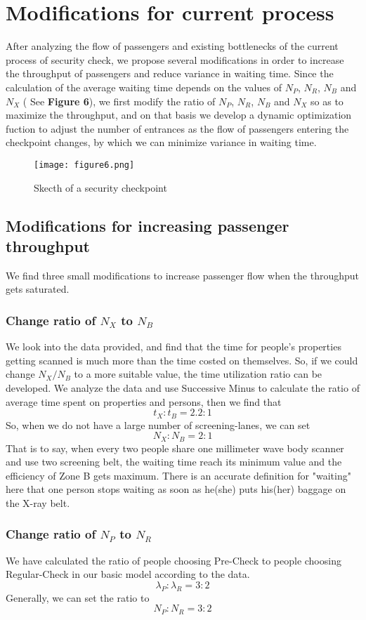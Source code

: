 \documentclass{mcmthesis}
\begin{document}
\section{Modifications for current process}
After analyzing the flow of passengers and existing bottlenecks of the current process of security check, we propose several modifications in order to increase the throughput of passengers and reduce variance in waiting time. Since the calculation of the average waiting time depends on the values of $N_P$, $N_R$, $N_B$ and $N_X$ ( See \textbf{Figure 6}), we first modify the ratio of $N_P$, $N_R$, $N_B$ and $N_X$ so as to maximize the throughput, and on that basis we develop a dynamic optimization fuction to adjust the number of entrances as the flow of passengers entering the checkpoint changes, by which we can minimize variance in waiting time.  
\begin{figure}[h]
\small
\centering
\texttt{[image: figure6.png]}
\caption{Skecth of a security checkpoint} \label{fig:Skecth of a security checkpoint}
\end{figure}
\subsection{Modifications for increasing passenger throughput}
We find three small modifications to increase passenger flow when the throughput gets saturated.
\subsubsection{Change ratio of $N_X$ to $N_B$}
We look into the data provided, and find that the time for people's properties getting scanned is much more than the time costed on themselves. So, if we could change $N_X/N_B$ to a more suitable value, the time utilization ratio can be developed. We analyze the data and use Successive Minus to calculate the ratio of average time spent on properties and persons, then we find that
$$t_X:t_B=2.2:1$$
So, when we do not have a large number of screening-lanes, we can set 
$$N_X:N_B=2:1$$
That is to say, when every two people share one millimeter wave body scanner and use two screening belt, the waiting time reach its minimum value and the efficiency of Zone B gets maximum. There is an accurate definition for "waiting" here that one person stops waiting as soon as he(she) puts his(her) baggage on the X-ray belt.
\subsubsection{Change ratio of $N_P$ to $N_R$}
We have calculated the ratio of people choosing Pre-Check to people choosing Regular-Check in our basic model according to the data.
$$\lambda_P:\lambda_R=3:2$$
Generally, we can set the ratio to
$$N_P:N_R=3:2$$
\end{document}
